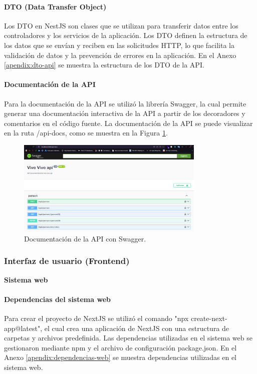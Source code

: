 \paragraph{DTO (Data Transfer Object)}
Los DTO en NestJS son clases que se utilizan para transferir datos entre los controladores y los servicios de la aplicación. Los DTO definen la
estructura de los datos que se envían y reciben en las solicitudes HTTP, lo que facilita la validación de datos y la prevención de errores en la
aplicación. En el Anexo \ref{apendix:dto-api} se muestra la estructura de los DTO de la API.

\paragraph{Documentación de la API}
Para la documentación de la API se utilizó la librería Swagger, la cual permite generar una documentación interactiva de la API a partir de los
decoradores y comentarios en el código fuente. La documentación de la API se puede visualizar en la ruta /api-docs, como se muestra en la Figura
\ref{fih:documentacion-api}.

\begin{figure}[H]
    \centering
    \includegraphics[width=0.8\textwidth]{chapters/III-resultados-y-discusion/resources/images/documentacion-api.png}
    \caption{Documentación de la API con Swagger.}
    \label{fih:documentacion-api}
\end{figure}

\subsubsection{Interfaz de usuario (Frontend)}

\textbf{Sistema web}
\bigbreak

\paragraph{Dependencias del sistema web}
Para crear el proyecto de NextJS se utilizó el comando "npx create-next-app@latest", el cual crea una aplicación de
NextJS con una estructura de carpetas y archivos predefinida. Las dependencias utilizadas en el sistema web se gestionaron mediante
npm y el archivo de configuración package.json. En el Anexo \ref{apendix:dependencias-web} se muestra dependencias utilizadas en el
sistema web.


